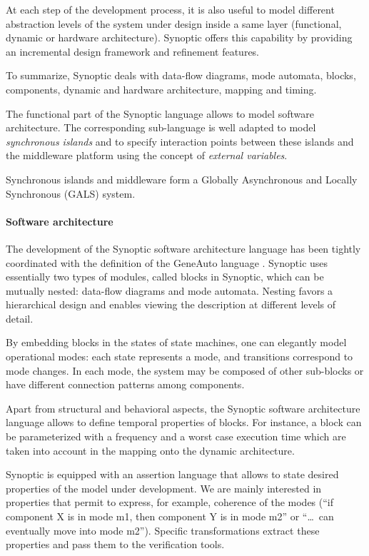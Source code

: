 \documentclass[copyright,creativecommons]{eptcs}
\renewcommand{\:}{{:}}
\begin{document}
At each step of the development process, it is also useful to model  different abstraction levels of the system under design inside a same layer (functional, dynamic or hardware architecture). Synoptic offers this capability by providing an incremental design framework and refinement features.


To summarize, Synoptic deals with data-flow diagrams, mode automata, blocks, components, dynamic and hardware architecture, mapping and timing.


The functional part of the Synoptic language allows to model software architecture. The corresponding sub-language is well adapted to model {\em synchronous islands} and to specify interaction points between these islands and the middleware platform using the concept of {\em external variables}.


Synchronous islands and middleware form a Globally Asynchronous and Locally Synchronous (GALS) system.


\paragraph{Software architecture}



The development of the Synoptic software architecture language has been tightly coordinated with the definition of the GeneAuto language \cite{GeneAuto}. Synoptic  uses essentially two types of modules, called blocks in Synoptic, which can be mutually nested: data-flow diagrams and mode automata. Nesting favors a hierarchical design and enables  viewing the description at different levels of detail.

By embedding blocks in the states of state machines, one can elegantly model operational modes: each state represents a mode, and transitions correspond to mode changes. In each mode, the system may be composed of other sub-blocks or have different connection patterns among components.

Apart from structural and behavioral aspects, the Synoptic software architecture language allows to define temporal properties of blocks. For instance, a block can be parameterized with a frequency and a worst case execution time which are taken into account in the mapping onto the dynamic architecture. 


Synoptic is equipped with an assertion language that allows to state desired properties of the model under development. We are mainly interested in  properties that permit to express, for example, coherence of the modes (``if component X is in mode m1, then component Y is in mode m2'' or ``\ldots\ can eventually move into mode m2''). Specific transformations extract these properties and pass them to the verification tools.
\end{document}
